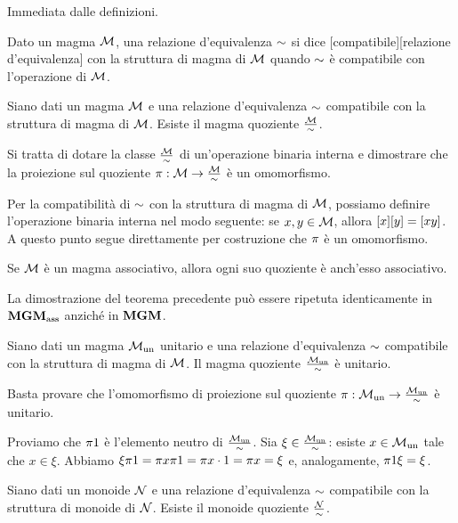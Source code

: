 \Proof Immediata dalle definizioni. \EndProof
\begin{Definition}
	Dato un magma $\mathcal{M}$, una relazione d'equivalenza $\Equivalence$ si dice [compatibile][relazione d'equivalenza] con la struttura di magma di $\mathcal{M}$ quando $\Equivalence$ \`e compatibile con l'operazione di $\mathcal{M}$.
\end{Definition}
\begin{Theorem}
	Siano dati un magma $\mathcal{M}$ e una relazione d'equivalenza $\Equivalence$ compatibile con la struttura di magma di $\mathcal{M}$. Esiste il magma quoziente $\Quotient{\Magma}{\Equivalence}$.
\end{Theorem}
\Proof Si tratta di dotare la classe $\Quotient{\Magma}{\Equivalence}$ di un'operazione binaria interna e dimostrare che la proiezione sul quoziente $\Projection: \Magma \rightarrow \Quotient{\Magma}{\Equivalence}$ \`e un omomorfismo.
\par Per la compatibilit\`a di $\Equivalence$ con la struttura di magma di $\mathcal{M}$, possiamo definire l'operazione binaria interna nel modo seguente: se $x, y \in \mathcal{M}$, allora $\EquivalenceClass{x}\EquivalenceClass{y} = \EquivalenceClass{xy}$. A questo punto segue direttamente per costruzione che $\Projection$ \`e un omomorfismo. \EndProof
\begin{Corollary}
	Se $\mathcal{M}$ \`e un magma associativo, allora ogni suo quoziente \`e anch'esso associativo.
\end{Corollary}
\Proof La dimostrazione del teorema precedente pu\`o essere ripetuta identicamente in $\mathbf{MGM}_{\text{ass}}$ anzich\'e in $\mathbf{MGM}$. \EndProof
\begin{Theorem}
	Siano dati un magma ${\mathcal{M}_{\text{un}}}$ unitario e una relazione d'equivalenza $\Equivalence$ compatibile con la struttura di magma di $\mathcal{M}$. Il magma quoziente $\Quotient{\UnitaryMagma}{\Equivalence}$ \`e unitario.
\end{Theorem}
\Proof Basta provare che l'omomorfismo di proiezione sul quoziente $\Projection: \UnitaryMagma \rightarrow \Quotient{\UnitaryMagma}{\Equivalence}$ \`e unitario.
\par Proviamo che $\Projection{1}$ \`e l'elemento neutro di $\Quotient{\UnitaryMagma}{\Equivalence}$. Sia $\xi \in \Quotient{\UnitaryMagma}{\Equivalence}$: esiste $x \in {\mathcal{M}_{\text{un}}}$ tale che $x \in \xi$. Abbiamo $\xi\Projection{1} = \Projection{x}\Projection{1} = \Projection{x \cdot 1} = \Projection{x} = \xi$ e, analogamente, $\Projection{1}\xi = \xi$. \EndProof
\begin{Corollary}
	Siano dati un monoide $\mathcal{N}$ e una relazione d'equivalenza $\Equivalence$ compatibile con la struttura di monoide di $\mathcal{N}$. Esiste il monoide quoziente $\Quotient{\Monoid}{\Equivalence}$.
\end{Corollary}
